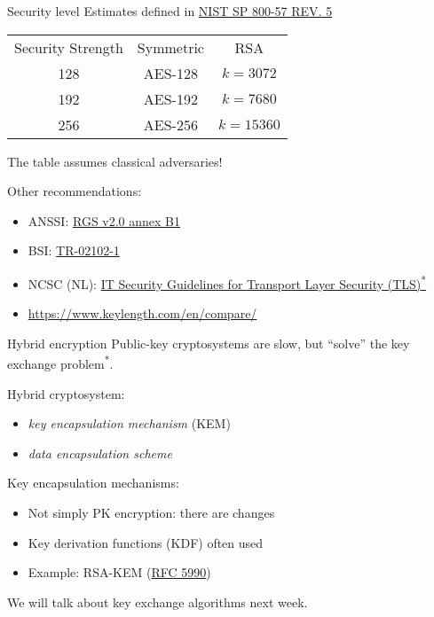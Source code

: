 \begin{frame}{Security level}
  Estimates defined in \href{https://csrc.nist.gov/pubs/sp/800/57/pt1/r5/final}{NIST SP 800-57 REV. 5}

  \pause
  \begin{center}
  \begin{tabular}{|c|c|c|}
    Security Strength & Symmetric & RSA\\
    128 & AES-128 & $k = 3072$\\
    192 & AES-192 & $k = 7680$\\
    256 & AES-256 & $k = 15360$
  \end{tabular}
  \end{center}

  \pause
  The table assumes classical adversaries!

  \pause
  Other recommendations:
  \begin{itemize}
    \item ANSSI: \href{https://cyber.gouv.fr/le-referentiel-general-de-securite-version-20-les-documents}{RGS v2.0 annex B1}
    \item BSI: \href{https://www.bsi.bund.de/EN/Themen/Unternehmen-und-Organisationen/Standards-und-Zertifizierung/Technische-Richtlinien/TR-nach-Thema-sortiert/tr02102/tr02102_node.html}{TR-02102-1}
    \item NCSC (NL): \href{https://english.ncsc.nl/publications/publications/2021/january/19/it-security-guidelines-for-transport-layer-security-2.1}{IT Security Guidelines for
    Transport Layer Security (TLS)\textsuperscript{*}}
    \item \url{https://www.keylength.com/en/compare/}
  \end{itemize}
\end{frame}

\begin{frame}{Hybrid encryption}
  Public-key cryptosystems are slow, but \enquote{solve} the key exchange problem\textsuperscript{*}.

  \pause
  Hybrid cryptosystem:
  \begin{itemize}[<+(1)->]
    \item \emph{key encapsulation mechanism} (KEM)
    \item \emph{data encapsulation scheme}
  \end{itemize}

  \pause
  Key encapsulation mechanisms:
  \begin{itemize}[<+(1)->]
    \item Not simply PK encryption: there are changes
    \item Key derivation functions (KDF) often used
    \item Example: RSA-KEM (\href{https://datatracker.ietf.org/doc/html/rfc5990}{RFC 5990})
  \end{itemize}

  \pause
  We will talk about key exchange algorithms next week.
\end{frame}

